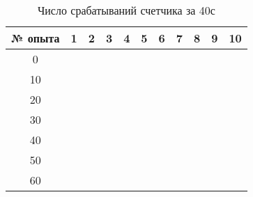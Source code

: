 \documentclass[a4paper,12pt]{article} %
\begin{document}
\newpage
\begin{table}[h]
\centering
\caption{Число срабатываний счетчика за 40с}
\label{table 3}
\renewcommand{\tabcolsep}{4mm}
\begin{tabular}{|c|l|l|l|l|l|l|l|l|l|l|}
\hline
№ опыта & \multicolumn{1}{c|}{1} & \multicolumn{1}{c|}{2} & \multicolumn{1}{c|}{3} & \multicolumn{1}{c|}{4} & \multicolumn{1}{c|}{5} & \multicolumn{1}{c|}{6} & \multicolumn{1}{c|}{7} & \multicolumn{1}{c|}{8} & \multicolumn{1}{c|}{9} & \multicolumn{1}{c|}{10} \\ \hline
0       &                        &                        &                        &                        &                        &                        &                        &                        &                        &                         \\ \hline
10      &                        &                        &                        &                        &                        &                        &                        &                        &                        &                         \\ \hline
20      &                        &                        &                        &                        &                        &                        &                        &                        &                        &                         \\ \hline
30      &                        &                        &                        &                        &                        &                        &                        &                        &                        &                         \\ \hline
40      &                        &                        &                        &                        &                        &                        &                        &                        &                        &                         \\ \hline
50      &                        &                        &                        &                        &                        &                        &                        &                        &                        &                         \\ \hline
60      &                        &                        &                        &                        &                        &                        &                        &                        &                        &                         \\ \hline

\end{tabular}
\end{table}
\end{document}
